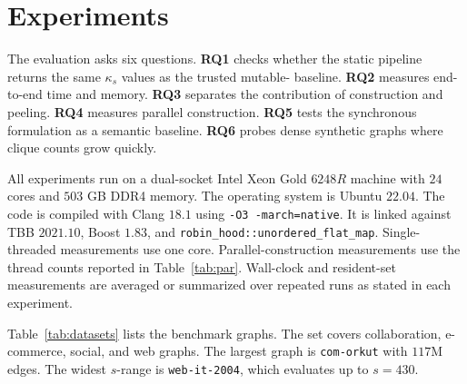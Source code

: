 \section{Experiments}\label{sec:exp}

The evaluation asks six questions.
%
\textbf{RQ1} checks whether the static pipeline returns the same \(\kappa_s\) values as the trusted mutable-\cpi{} baseline.
%
\textbf{RQ2} measures end-to-end time and memory.
%
\textbf{RQ3} separates the contribution of construction and peeling.
%
\textbf{RQ4} measures parallel construction.
%
\textbf{RQ5} tests the synchronous \localH{} formulation as a semantic baseline.
%
\textbf{RQ6} probes dense synthetic graphs where clique counts grow quickly.

All experiments run on a dual-socket Intel Xeon Gold \(6248R\) machine with \(24\) cores and \(503\) GB DDR4 memory.
%
The operating system is Ubuntu \(22.04\).
%
The code is compiled with Clang \(18.1\) using \texttt{-O3 -march=native}.
%
It is linked against TBB \(2021.10\), Boost \(1.83\), and \texttt{robin\_hood::unordered\_flat\_map}.
%
Single-threaded measurements use one core.
%
Parallel-construction measurements use the thread counts reported in Table~\ref{tab:par}.
%
Wall-clock and resident-set measurements are averaged or summarized over repeated runs as stated in each experiment.

Table~\ref{tab:datasets} lists the benchmark graphs.
%
The set covers collaboration, e-commerce, social, and web graphs.
%
The largest graph is \texttt{com-orkut} with \(117\)M edges.
%
The widest \(s\)-range is \texttt{web-it-2004}, which evaluates up to \(s=430\).

